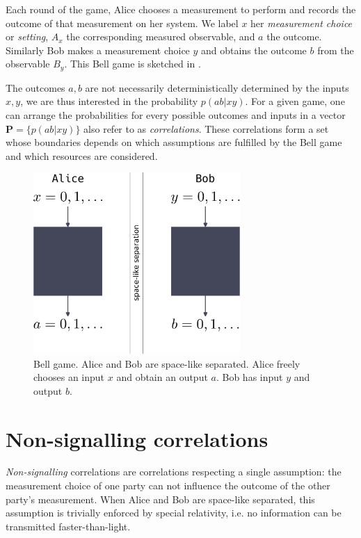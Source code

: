 Each round of the game, Alice chooses a measurement to perform and records the outcome of that measurement on her system.
We label $x$ her \textit{measurement choice} or \textit{setting}, $A_x$ the corresponding measured observable, and $a$ the outcome.
Similarly Bob makes a measurement choice $y$ and obtains the outcome $b$ from the observable $B_y$.
This Bell game is sketched in .

The outcomes $a,b$ are not necessarily deterministically determined by the inputs $x,y$, we are thus interested in the probability $p(ab|xy)$. 
For a given game, one can arrange the probabilities for every possible outcomes and inputs in a vector $\mathbf{P}=\{ p(ab|xy)\}$ also refer to as \textit{correlations}.
These correlations form a set whose boundaries depends on which assumptions are fulfilled by the Bell game and which resources are considered.

\begin{figure}
	\begin{center}
		\includegraphics[width=0.7\textwidth]{chapters/overview/img/belltest.pdf}
	\end{center}
	\caption{Bell game. Alice and Bob are space-like separated. Alice freely chooses an input $x$ and obtain an output $a$. Bob has input $y$ and output $b$.}
	\label{fig:belltest}
\end{figure}


\section{Non-signalling correlations}

\textit{Non-signalling} correlations are correlations respecting a single assumption: the measurement choice of one party can not influence the outcome of the other party's measurement.
When Alice and Bob are space-like separated, this assumption is trivially enforced by special relativity, i.e. no information can be transmitted faster-than-light.


